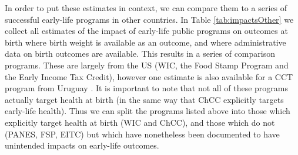 \documentclass[12pt]{article}
\begin{document}
\begin{spacing}{1.4}
In order to put these estimates in context, we can compare them to a
series of successful early-life programs in other countries.  In Table
\ref{tab:impactsOther} we collect all estimates of the impact of
early-life public programs on outcomes at birth where birth weight is
available as an outcome, and where administrative data on birth outcomes
are available.  This results in a series of comparison programs.  These
are largely from the US (WIC, the Food Stamp Program and the Early
Income Tax Credit), however one estimate is also available for a CCT
program from Uruguay \citep{Amaranteetal2016}.  It is important to note
that not all of these programs actually target health at birth (in the same
way that ChCC explicitly targets early-life health).  Thus we can split
the programs listed above into those which explicitly target health at
birth (WIC and ChCC), and those which do not (PANES, FSP, EITC) but
which have nonetheless been documented to have unintended impacts on
early-life outcomes.


\end{spacing}
\end{document}
